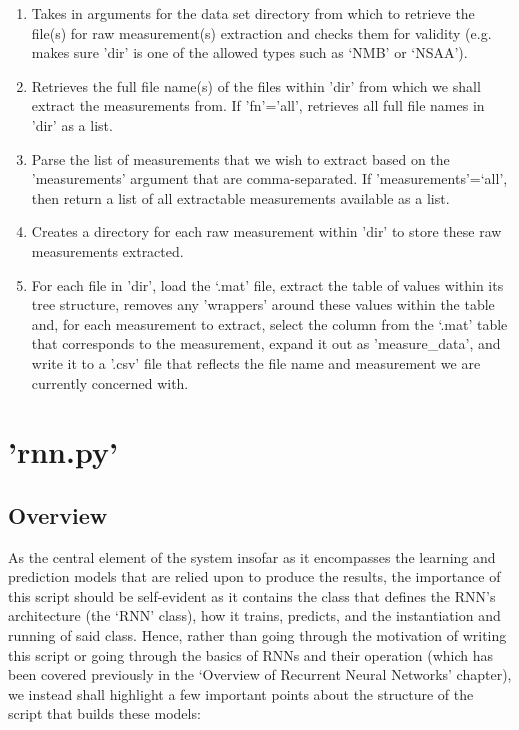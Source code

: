\documentclass[12pt,twoside]{report}
\begin{document}
\begin{enumerate}
	\item Takes in arguments for the data set directory from which to retrieve the file(s) for raw measurement(s) extraction and checks them for validity (e.g. makes sure 'dir' is one of the allowed types such as ‘NMB’ or ‘NSAA’).
	\item Retrieves the full file name(s) of the files within 'dir' from which we shall extract the measurements from. If 'fn'='all', retrieves all full file names in 'dir' as a list.
	\item Parse the list of measurements that we wish to extract based on the 'measurements' argument that are comma-separated. If 'measurements'=‘all’, then return a list of all extractable measurements available as a list.
	\item Creates a directory for each raw measurement within 'dir' to store these raw measurements extracted.
	\item For each file in 'dir', load the ‘.mat’ file, extract the table of values within its tree structure, removes any 'wrappers' around these values within the table and, for each measurement to extract, select the column from the ‘.mat’ table that corresponds to the measurement, expand it out as 'measure\_data', and write it to a '.csv' file that reflects the file name and measurement we are currently concerned with.
\end{enumerate}



\section{'rnn.py'}

\subsection{Overview}

\quad As the central element of the system insofar as it encompasses the learning and prediction models that are relied upon to produce the results, the importance of this script should be self-evident as it contains the class that defines the RNN's architecture (the ‘RNN’ class), how it trains, predicts, and the instantiation and running of said class. Hence, rather than going through the motivation of writing this script or going through the basics of RNNs and their operation (which has been covered previously in the ‘Overview of Recurrent Neural Networks’ chapter), we instead shall highlight a few important points about the structure of the script that builds these models:
\end{document}
